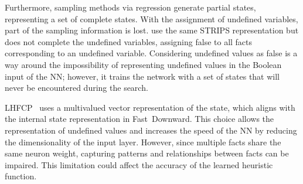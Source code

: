 Furthermore, sampling methods via regression generate partial states, representing a set of complete states. With the assignment of undefined variables, part of the sampling information is lost. \citet{yu2020learning} use the same STRIPS representation but does not complete the undefined variables, assigning false to all facts corresponding to an undefined variable. Considering undefined values as false is a way around the impossibility of representing undefined values in the Boolean input of the NN; however, it trains the network with a set of states that will never be encountered during the search.

LHFCP~\cite{geissmann2015learning} uses a multivalued \sas vector representation of the state, which aligns with the internal state representation in Fast~Downward. This choice allows the representation of undefined values and increases the speed of the NN by reducing the dimensionality of the input layer. However, since multiple facts share the same neuron weight, capturing patterns and relationships between facts can be impaired. This limitation could affect the accuracy of the learned heuristic function.
